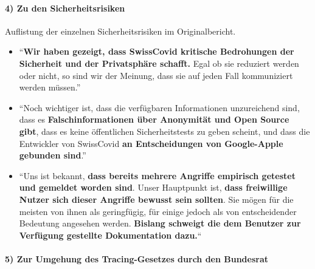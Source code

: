 \hypertarget{4-zu-den-sicherheitsrisiken}{%
\paragraph{4) Zu den
Sicherheitsrisiken}\label{4-zu-den-sicherheitsrisiken}}

Auflistung der einzelnen Sicherheitsrisiken im Originalbericht.

\begin{itemize}
\tightlist
\item
  ``\textbf{Wir haben gezeigt, dass SwissCovid kritische Bedrohungen der
  Sicherheit und der Privatsphäre schafft.} Egal ob sie reduziert werden
  oder nicht, so sind wir der Meinung, dass sie auf jeden Fall
  kommuniziert werden müssen.''
\item
  ``Noch wichtiger ist, dass die verfügbaren Informationen unzureichend
  sind, dass es \textbf{Falschinformationen über Anonymität und Open
  Source gibt}, dass es keine öffentlichen Sicherheitstests zu geben
  scheint, und dass die Entwickler von SwissCovid \textbf{an
  Entscheidungen von Google-Apple gebunden sind}.''
\item
  ``Uns ist bekannt, \textbf{dass bereits mehrere Angriffe empirisch
  getestet und gemeldet worden sind}. Unser Hauptpunkt ist, \textbf{dass
  freiwillige Nutzer sich dieser Angriffe bewusst sein sollten}. Sie
  mögen für die meisten von ihnen als geringfügig, für einige jedoch als
  von entscheidender Bedeutung angesehen werden. \textbf{Bislang
  schweigt die dem Benutzer zur Verfügung gestellte Dokumentation
  dazu.}``
\end{itemize}

\hypertarget{5-zur-umgehung-des-tracing-gesetzes-durch-den-bundesrat}{%
\paragraph{5) Zur Umgehung des Tracing-Gesetzes durch den
Bundesrat}\label{5-zur-umgehung-des-tracing-gesetzes-durch-den-bundesrat}}

